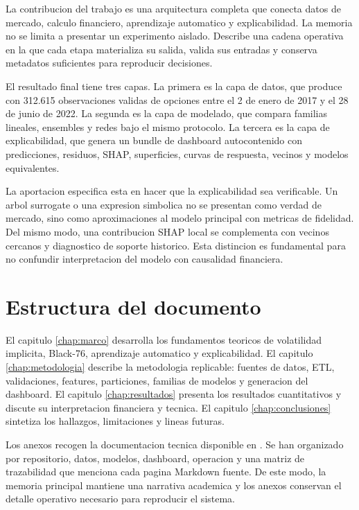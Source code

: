 La contribucion del trabajo es una arquitectura completa que conecta datos de mercado, calculo financiero, aprendizaje automatico y explicabilidad. La memoria no se limita a presentar un experimento aislado. Describe una cadena operativa en la que cada etapa materializa su salida, valida sus entradas y conserva metadatos suficientes para reproducir decisiones.

El resultado final tiene tres capas. La primera es la capa de datos, que produce  con 312.615 observaciones validas de opciones entre el 2 de enero de 2017 y el 28 de junio de 2022. La segunda es la capa de modelado, que compara familias lineales, ensembles y redes bajo el mismo protocolo. La tercera es la capa de explicabilidad, que genera un bundle de dashboard autocontenido con predicciones, residuos, SHAP, superficies, curvas de respuesta, vecinos y modelos equivalentes.

La aportacion especifica esta en hacer que la explicabilidad sea verificable. Un arbol surrogate o una expresion simbolica no se presentan como verdad de mercado, sino como aproximaciones al modelo principal con metricas de fidelidad. Del mismo modo, una contribucion SHAP local se complementa con vecinos cercanos y diagnostico de soporte historico. Esta distincion es fundamental para no confundir interpretacion del modelo con causalidad financiera.

\section{Estructura del documento}

El capitulo \ref{chap:marco} desarrolla los fundamentos teoricos de volatilidad implicita, Black-76, aprendizaje automatico y explicabilidad. El capitulo \ref{chap:metodologia} describe la metodologia replicable: fuentes de datos, ETL, validaciones, features, particiones, familias de modelos y generacion del dashboard. El capitulo \ref{chap:resultados} presenta los resultados cuantitativos y discute su interpretacion financiera y tecnica. El capitulo \ref{chap:conclusiones} sintetiza los hallazgos, limitaciones y lineas futuras.

Los anexos recogen la documentacion tecnica disponible en . Se han organizado por repositorio, datos, modelos, dashboard, operacion y una matriz de trazabilidad que menciona cada pagina Markdown fuente. De este modo, la memoria principal mantiene una narrativa academica y los anexos conservan el detalle operativo necesario para reproducir el sistema.

